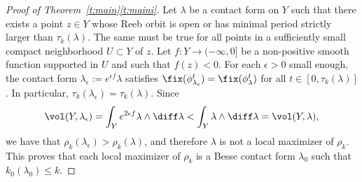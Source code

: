 \begin{proof}[Proof of Theorem~\ref{t:main}\eqref{t:maini}]
Let $\lambda$ be a contact form on $Y$ such that there exists a point $z\in Y$ whose Reeb orbit is open or has minimal period strictly larger than $\tau_k(\lambda)$. The same must be true for all points in a sufficiently small compact neighborhood $U\subset Y$ of $z$. Let $f:Y\to(-\infty,0]$ be a non-positive smooth function supported in $U$ and such that $f(z)<0$. For each $\epsilon>0$ small enough, the contact form $\lambda_\epsilon:=e^{\epsilon f}\lambda$ satisfies $\fix(\phi_{\lambda_\epsilon}^t)=\fix(\phi_{\lambda}^t)$ for all $t\in[0,\tau_k(\lambda)]$. In particular, $\tau_k(\lambda_\epsilon)=\tau_k(\lambda)$. Since
\[
\vol(Y,\lambda_\epsilon) = \int_Y e^{2\epsilon f} \lambda\wedge\diff\lambda <
\int_Y \lambda\wedge\diff\lambda = \vol(Y,\lambda),
\]
we have that $\rho_k(\lambda_\epsilon)>\rho_k(\lambda)$, and therefore $\lambda$ is not a local maximizer of $\rho_k$. This proves that each local maximizer of $\rho_k$ is a Besse contact form $\lambda_0$ such that $k_0(\lambda_0)\leq k$.


\end{proof}
